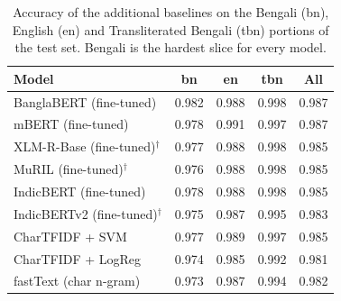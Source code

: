 \begin{table}[h]
\centering
\caption{Accuracy of the additional baselines on the Bengali (bn), English (en) and Transliterated Bengali (tbn) portions of the test set. Bengali is the hardest slice for every model.}
\label{tab:baselines-per-language}
\begin{tabular}{@{}lcccc@{}}
\toprule
\textbf{Model} & \textbf{bn} & \textbf{en} & \textbf{tbn} & \textbf{All} \\
\midrule
BanglaBERT (fine-tuned) & 0.982 & 0.988 & 0.998 & 0.987\\
mBERT (fine-tuned) & 0.978 & 0.991 & 0.997 & 0.987\\
XLM-R-Base (fine-tuned)$^\dagger$ & 0.977 & 0.988 & 0.998 & 0.985\\
MuRIL (fine-tuned)$^\dagger$ & 0.976 & 0.988 & 0.998 & 0.985\\
IndicBERT (fine-tuned) & 0.978 & 0.988 & 0.998 & 0.985\\
IndicBERTv2 (fine-tuned)$^\dagger$ & 0.975 & 0.987 & 0.995 & 0.983\\
CharTFIDF + SVM & 0.977 & 0.989 & 0.997 & 0.985\\
CharTFIDF + LogReg & 0.974 & 0.985 & 0.992 & 0.981\\
fastText (char n-gram) & 0.973 & 0.987 & 0.994 & 0.982\\
\bottomrule
\end{tabular}
\end{table}
